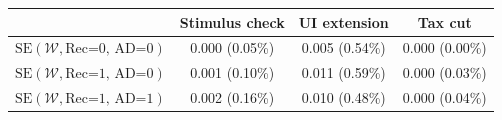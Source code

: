 \begin{tabular}{@{}lccc@{}}
\toprule
                          & Stimulus check      & UI extension    & Tax cut    \\  \midrule
$\mathrm{SE}(\mathcal{W}, \text{Rec=0, AD=0})$ & 0.000 (0.05\%)  & 0.005 (0.54\%)  & 0.000 (0.00\%)     \\
$\mathrm{SE}(\mathcal{W}, \text{Rec=1, AD=0})$ & 0.001 (0.10\%)  & 0.011 (0.59\%)  & 0.000 (0.03\%)     \\
$\mathrm{SE}(\mathcal{W}, \text{Rec=1, AD=1})$ & 0.002 (0.16\%)  & 0.010 (0.48\%)  & 0.000 (0.04\%)     \\ \bottomrule
\end{tabular}
